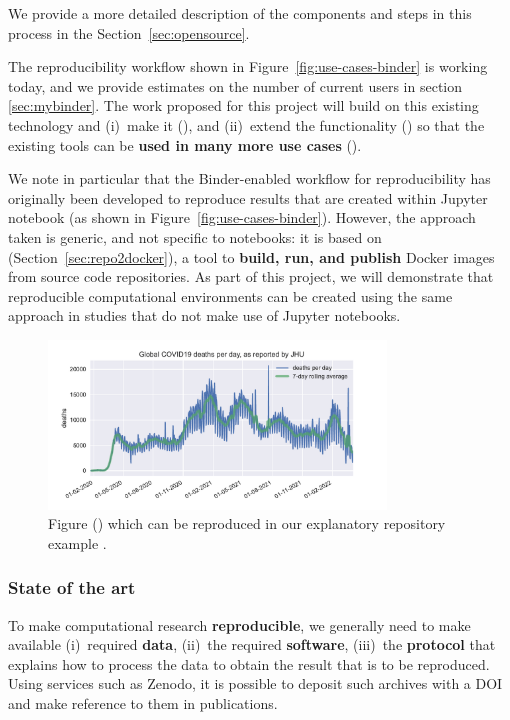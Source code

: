 We provide a more detailed description of the components and steps in this
process in the Section~\ref{sec:opensource}.

The reproducibility workflow shown in Figure~\ref{fig:use-cases-binder} is
working today, and we provide estimates on the number of current users in
section \ref{sec:mybinder}. The work proposed for this project will build on
this existing technology and (i)~make it 
(), and (ii)~extend the functionality () so
that the existing tools can be \textbf{used in many more use cases}
().

We note in particular that the Binder-enabled workflow for reproducibility has
originally been developed to reproduce results that are created within Jupyter
notebook (as shown in Figure~\ref{fig:use-cases-binder}).
However, the approach taken is generic, and not specific to notebooks: it is
based on \repotodocker{} (Section~\ref{sec:repo2docker}), a tool to \textbf{build, run, and
publish} Docker images from source code repositories.
As part of this project, we will demonstrate that reproducible
computational environments can be created using the same approach
in studies that do not make use of Jupyter notebooks.

\begin{figure}
  \centering
  \includegraphics[width=0.8\textwidth]{images/figure1.pdf}
  \caption{Figure () which can be reproduced in our explanatory repository example
    \cite{ReproducibilityRepositoryExample2022}. \label{fig:reproducibility-example-covid}}
\end{figure}


\subsubsection{State of the art}

To make computational research \textbf{reproducible}, we generally need to make available
(i)~required \textbf{data}, (ii)~the required \textbf{software}, (iii)~the \textbf{protocol} that explains
how to process the data to obtain the result that is to be reproduced. Using
services such as Zenodo, it is possible to deposit such archives with a DOI and
make reference to them in publications.


